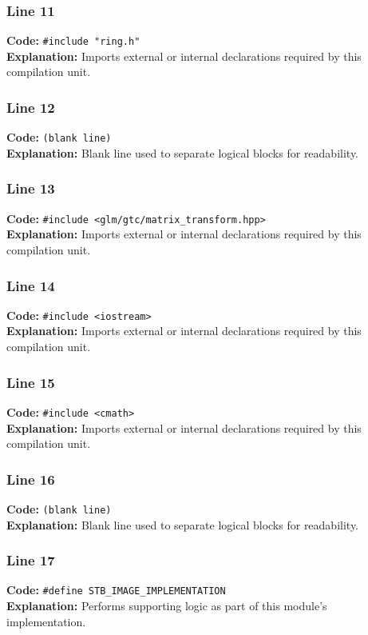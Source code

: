 \documentclass[11pt,a4paper]{article}
\begin{document}
\subsubsection*{Line 11}
\textbf{Code:} \verb|#include "ring.h"|\\
\textbf{Explanation:} Imports external or internal declarations required by this compilation unit.

\subsubsection*{Line 12}
\textbf{Code:} \texttt{(blank line)}\\
\textbf{Explanation:} Blank line used to separate logical blocks for readability.

\subsubsection*{Line 13}
\textbf{Code:} \verb|#include <glm/gtc/matrix_transform.hpp>|\\
\textbf{Explanation:} Imports external or internal declarations required by this compilation unit.

\subsubsection*{Line 14}
\textbf{Code:} \verb|#include <iostream>|\\
\textbf{Explanation:} Imports external or internal declarations required by this compilation unit.

\subsubsection*{Line 15}
\textbf{Code:} \verb|#include <cmath>|\\
\textbf{Explanation:} Imports external or internal declarations required by this compilation unit.

\subsubsection*{Line 16}
\textbf{Code:} \texttt{(blank line)}\\
\textbf{Explanation:} Blank line used to separate logical blocks for readability.

\subsubsection*{Line 17}
\textbf{Code:} \verb|#define STB_IMAGE_IMPLEMENTATION|\\
\textbf{Explanation:} Performs supporting logic as part of this module's implementation.
\end{document}
